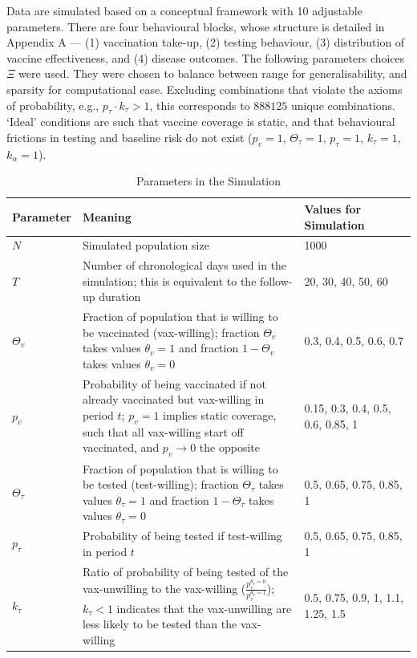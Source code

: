 \documentclass[12pt]{article}
\begin{document}
Data are simulated based on a conceptual framework with 10 adjustable parameters. There are four behavioural blocks, whose structure is detailed in Appendix A --- (1) vaccination take-up, (2) testing behaviour, (3) distribution of vaccine effectiveness, and (4) disease outcomes. The following parameters choices $\Xi$ were used. They were chosen to balance between range for generalisability, and sparsity for computational ease. Excluding combinations that violate the axioms of probability, e.g., $p_\tau \cdot k_\tau > 1$, this corresponds to $888125$ unique combinations. `Ideal' conditions are such that vaccine coverage is static, and that behavioural frictions in testing and baseline risk do not exist ($p_v=1$, $\Theta_{\tau}=1$, $p_{\tau}=1$, $k_{\tau}=1$, $k_{\alpha}=1$).
\begin{table}[H]
	\begin{center}
		\caption{Parameters in the Simulation}
		\begin{tabular}{||p{0.15\linewidth}| p{0.57\linewidth}|p{0.28\linewidth}||}
			\hline \hline
			\textbf{Parameter} & \textbf{Meaning} & \textbf{Values for Simulation} \\
			\hline \hline 
			$N$ & Simulated population size & 1000 \\
			\hline 
			$T$ & Number of chronological days used in the simulation; this is equivalent to the follow-up duration & 20, 30, 40, 50, 60 \\
			\hline 
			$\Theta_{v}$ & Fraction of population that is willing to be vaccinated (vax-willing); fraction $\Theta_{v}$ takes values $\theta_{v} = 1$ and fraction $1 - \Theta_{v}$ takes values $\theta_{v} = 0$ & 0.3, 0.4, 0.5, 0.6, 0.7 \\
			\hline 
			$p_v$ & Probability of being vaccinated if not already vaccinated but vax-willing in period $t$; $p_v=1$ implies static coverage, such that all vax-willing start off vaccinated, and $p_v \rightarrow 0$ the opposite &  0.15, 0.3, 0.4, 0.5, 0.6, 0.85, 1 \\
			\hline 
			$\Theta_{\tau}$ & Fraction of population that is willing to be tested (test-willing); fraction $\Theta_{\tau}$ takes values $\theta_{\tau} = 1$ and fraction $1 - \Theta_{\tau}$ takes values $\theta_{\tau} = 0$ & 0.5, 0.65, 0.75, 0.85, 1 \\
			\hline 
			$p_\tau$ & Probability of being tested if test-willing in period $t$ & 0.5, 0.65, 0.75, 0.85, 1 \\
			\hline 
			$k_\tau$ & Ratio of probability of being tested of the vax-unwilling to the vax-willing ($\frac{p_\tau^{\theta_{v}=0}}{p_\tau^{\theta_{v}=1}}$); $k_\tau < 1$ indicates that the vax-unwilling are less likely to be tested than the vax-willing & 0.5, 0.75, 0.9, 1, 1.1, 1.25, 1.5 \\

\end{tabular}
\end{center}
\end{table}
\end{document}
